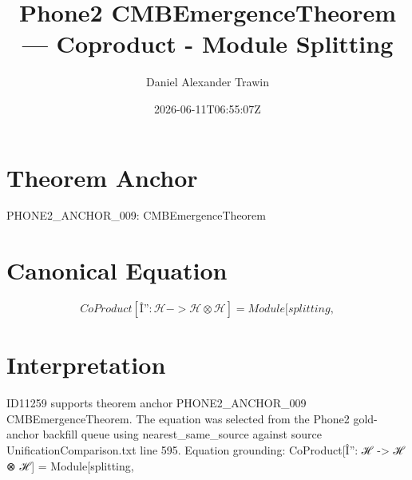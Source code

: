 \documentclass[11pt]{article}
\title{Phone2 CMBEmergenceTheorem — Coproduct - Module Splitting}
\author{Daniel Alexander Trawin}
\date{2026-06-11T06:55:07Z}
\begin{document}
\maketitle
\section*{Theorem Anchor}
PHONE2_ANCHOR_009: CMBEmergenceTheorem
\section*{Canonical Equation}
\[
CoProduct[Î”: ℋ -> ℋ ⊗ ℋ] = Module[{splitting},
\]
\section*{Interpretation}
ID11259 supports theorem anchor PHONE2_ANCHOR_009 CMBEmergenceTheorem. The equation was selected from the Phone2 gold-anchor backfill queue using nearest_same_source against source UnificationComparison.txt line 595. Equation grounding: CoProduct[Î”: ℋ -> ℋ ⊗ ℋ] = Module[{splitting},
\end{document}
